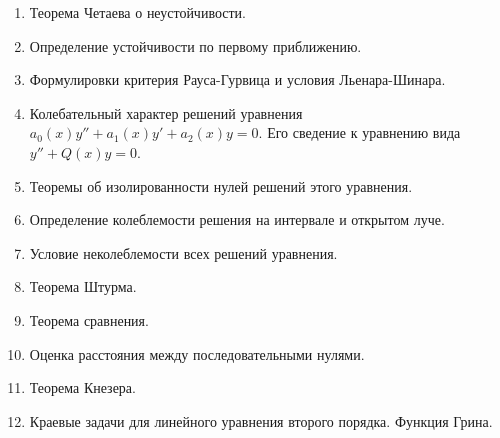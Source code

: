 \documentclass{article}
\begin{document}
\begin{enumerate}
  \item Теорема Четаева о неустойчивости.
  
  \item Определение устойчивости по первому приближению.
  
  \item Формулировки критерия Рауса-Гурвица и условия Льенара-Шинара.
  
  \item Колебательный характер решений уравнения $a_0(x)y'' + a_1(x)y' + a_2(x)y = 0$. Его сведение к уравнению вида $y'' + Q(x)y = 0$.
  
  \item Теоремы об изолированности нулей решений этого уравнения.

  \item Определение колеблемости решения на интервале и открытом луче.

  \item Условие неколеблемости всех решений уравнения.

  \item Теорема Штурма.

  \item Теорема сравнения.

  \item Оценка расстояния между последовательными нулями.

  \item Теорема Кнезера.

  \item Краевые задачи для линейного уравнения второго порядка. Функция Грина.
\end{enumerate}
\end{document}
